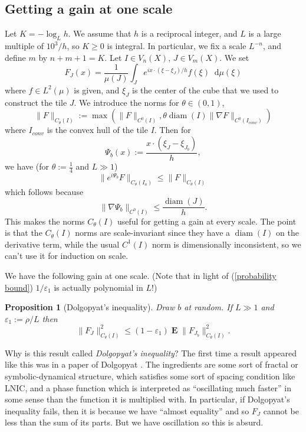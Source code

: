 \documentclass[reqno,12pt]{amsart}
\DeclareMathOperator*{\Expect}{\mathbf E}
\newcommand*\dif{\mathop{}\!\mathrm{d}}
\DeclareMathOperator{\diam}{diam}
\newcommand{\dfn}[1]{\emph{#1}\index{#1}}
\newtheorem{proposition}[theorem]{Proposition}
\theoremstyle{definition}
\numberwithin{equation}{section}
\begin{document}
\subsection{Getting a gain at one scale}
Let $K = -\log_L h$. We assume that $h$ is a reciprocal integer, and $L$ is a large multiple of $10^3/h$, so $K \geq 0$ is integral.
In particular, we fix a scale $L^{-n}$, and define $m$ by $n + m + 1 = K$.
Let $I \in V_n(X)$, $J \in V_m(X)$.
We set 
$$F_J(x) = \frac{1}{\mu(J)} \int_J e^{ix \cdot (\xi - \xi_J)/h} f(\xi) \dif \mu(\xi)$$
where $f \in L^2(\mu)$ is given, and $\xi_J$ is the center of the cube that we used to construct the tile $J$.
We introduce the norms for $\theta \in (0, 1)$,
$$\|F\|_{C_\theta(I)} := \max(\|F\|_{C^0(I)}, \theta \diam(I) \|\nabla F\|_{C^0(I_{conv})})$$
where $I_{conv}$ is the convex hull of the tile $I$. Then for 
$$\Psi_b(x) := \frac{x \cdot (\xi_J - \xi_{J_b})}{h},$$
we have (for $\theta := \frac{1}{4}$ and $L \gg 1$)
\begin{equation}\label{induction on scale Ctheta}
    \|e^{i\Psi_b} F\|_{C_\theta(I_a)} \leq \|F\|_{C_\theta(I)}
\end{equation}
which follows because 
$$\|\nabla \Psi_b\|_{C^0(I)} \leq \frac{\diam(J)}{h}.$$
This makes the norms $C_\theta(I)$ useful for getting a gain at every scale.
The point is that the $C_\theta(I)$ norms are scale-invariant since they have a $\diam(I)$ on the derivative term, while the usual $C^1(I)$ norm is dimensionally inconsistent, so we can't use it for induction on scale.

We have the following gain at one scale.
(Note that in light of (\ref{probability bound}) $1/\varepsilon_1$ is actually polynomial in $L$!)

\begin{proposition}[Dolgopyat's inequality]
Draw $b$ at random.
If $L \gg 1$ and $\varepsilon_1 := \rho/L$ then 
$$\|F_J\|_{C_\theta(I)}^2 \leq (1 - \varepsilon_1) \Expect \|F_{J_b}\|_{C_\theta(I)}^2.$$
\end{proposition}

Why is this result called \dfn{Dolgopyat's inequality}?
The first time a result appeared like this was in a paper of Dolgopyat \cite{Dolgopyat1998OnDO}.
The ingredients are some sort of fractal or symbolic-dynamical structure, which satisfies some sort of spacing condition like LNIC, and a phase function which is interpreted as ``oscillating much faster'' in some sense than the function it is multiplied with.
In particular, if Dolgopyat's inequality fails, then it is because we have ``almost equality'' and so $F_J$ cannot be less than the sum of its parts.
But we have oscillation so this is absurd.
\end{document}
